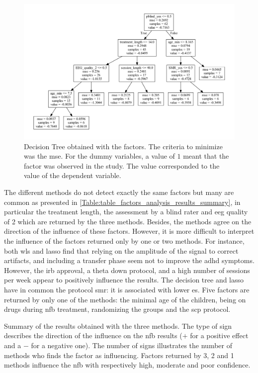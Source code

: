 \begin{figure}[h!]
  \centering
  \includegraphics[width=1.0\linewidth]{figures/factors_analysis_decision_tree_results_no_colors_2-columns_fitting_image}
  \caption{Decision Tree obtained with the factors. The criteria to minimize was the \gls{mse}. For the dummy variables, a value of $1$ meant
	that the factor was observed in the study. The value corresponded to the value of the dependent variable.}
  \label{Figure:factors_analysis_decision_tree_results}
\end{figure}

The different methods do not detect exactly the same factors but many are common as presented in \cref{Table:table_factors_analysis_results_summary},
 in particular the treatment length, the assessment by a blind rater and \gls{eeg} quality of 2 which are returned by the three methods. Besides, 
the methods agree on the direction of the influence of these factors. However, it is more difficult to interpret the influence of the factors 
returned only by one or two methods. For instance, both \gls{wls} and \gls{lasso} find that  
relying on the amplitude of the signal to correct artifacts, and including a transfer phase seem not to improve the \gls{adhd} symptoms. 
However, the \gls{irb} approval, a theta down protocol, and a high number of sessions per week appear to 
positively influence the results. The decision tree and \gls{lasso} have in common the protocol \gls{smr}: it is associated with lower \gls{es}.
Five factors are returned by only one of the methods: the minimal age of the children, being on drugs 
during \gls{nfb} treatment, randomizing the groups and the \gls{scp} protocol.  

\begin{table}[h!]
  \centering
  \caption{Summary of the results obtained with the three methods. The type of sign describes the direction of the influence on the \gls{nfb} 
	results ($+$ for a positive effect and a $-$ for a negative one). The number of signs illustrates the number of methods who finds the factor 
	as influencing. Factors returned by 3, 2 and 1 methods influence the \gls{nfb} with respectively high, moderate and poor confidence.}
  
  \label{Table:table_factors_analysis_results_summary}
\end{table}

